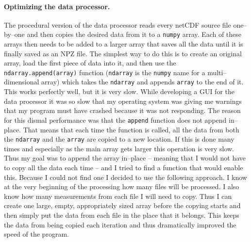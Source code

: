\documentclass[../00_main.tex]{subfiles}
\begin{document}
\paragraph{Optimizing the data processor.} The procedural version of the data
processor reads every netCDF source file one--by--one and then copies the
desired data from it to a \texttt{numpy} array. Each of these arrays then needs
to be added to a larger array that saves all the data until it is finally saved
as an NPZ file. The simplest way to do this is to create an original array,
load the first piece of data into it, and then use the
\texttt{ndarray.append(array)}
function (\texttt{ndarray} is the \texttt{numpy} name for a multi--dimensional
array) which takes the \texttt{ndarray} and appends \texttt{array} to the end of
it. This works perfectly well, but it is very slow. While developing a GUI for
the data processor it was so slow that my operating system was giving me
warnings that my program must have crashed because it was not responding. The
reason for this dismal performance was that the \texttt{append} function does
not append in--place. That means that each time the function is called, all the
data from both the \texttt{ndarray} and the \texttt{array} are copied to a new
location. If this is done many times and especially as the main array gets
larger this operation is very slow. Thus my goal was to append the array
in--place -- meaning that I would not have to copy all the data each time -- and
I tried to find a function that would enable this. Because I could not find one
I decided to use the following approach. I know at the very beginning of the
processing how many files will be processed. I also know how many measurements
from each file I will need to copy. Thus I can create one large, empty,
appropriately sized array before the copying starts and then simply put the
data from each file in the place that it belongs. This keeps the data from
being copied each iteration and thus dramatically improved the speed of the
program.
\end{document}
